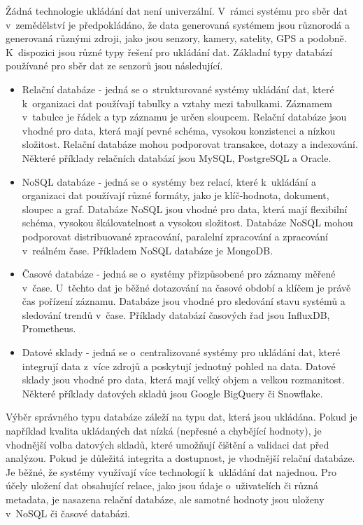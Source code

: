 Žádná technologie ukládání dat není univerzální. V~rámci systému pro sběr dat v~zemědělství je předpokládáno, že data generovaná systémem jsou různorodá a generovaná různými zdroji, jako jsou senzory, kamery, satelity, GPS a podobně. K~dispozici jsou různé typy řešení pro ukládání dat. Základní typy databází používané pro sběr dat ze senzorů jsou následující.
\begin{itemize}
    \item Relační databáze - jedná se o~strukturované systémy ukládání dat, které k~organizaci dat používají tabulky a vztahy mezi tabulkami. Záznamem v~tabulce je řádek a typ záznamu je určen sloupcem. Relační databáze jsou vhodné pro data, která mají pevné schéma, vysokou konzistenci a nízkou složitost. Relační databáze mohou podporovat transakce, dotazy a indexování. Některé příklady relačních databází jsou MySQL, PostgreSQL a Oracle.
    \item NoSQL databáze - jedná se o~systémy bez relací, které k~ukládání a organizaci dat používají různé formáty, jako je klíč-hodnota, dokument, sloupec a graf. Databáze NoSQL jsou vhodné pro data, která mají flexibilní schéma, vysokou škálovatelnost a vysokou složitost. Databáze NoSQL mohou podporovat distribuované zpracování, paralelní zpracování a zpracování v~reálném čase. Příkladem NoSQL databáze je MongoDB.
    \item Časové databáze - jedná se o~systémy přizpůsobené pro záznamy měřené v~čase. U~těchto dat je běžné dotazování na časové období a klíčem je právě čas pořízení záznamu. Databáze jsou vhodné pro sledování stavu systémů a sledování trendů v~čase. Příklady databází časových řad jsou InfluxDB, Prometheus.
    \item Datové sklady - jedná se o~centralizované systémy pro ukládání dat, které integrují data z~více zdrojů a poskytují jednotný pohled na data. Datové sklady jsou vhodné pro data, která mají velký objem a velkou rozmanitost. Některé příklady datových skladů jsou Google BigQuery či Snowflake.
\end{itemize}
Výběr správného typu databáze záleží na typu dat, která jsou ukládána. Pokud je například kvalita ukládaných dat nízká (nepřesné a chybějící hodnoty), je vhodnější volba datových skladů, které umožňují čištění a validaci dat před analýzou. Pokud je důležitá integrita a dostupnost, je vhodnější relační databáze. Je běžné, že systémy využívají více technologií k~ukládání dat najednou. Pro účely uložení dat obsahující relace, jako jsou údaje o~uživatelích či různá metadata, je nasazena relační databáze, ale samotné hodnoty jsou uloženy v~NoSQL či časové databázi. \cite{ted29891282time_POV6}

